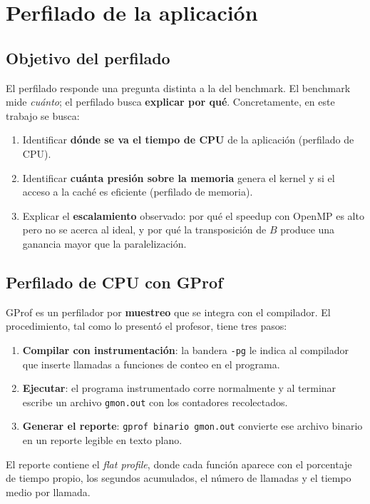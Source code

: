 \section{Perfilado de la aplicación}

\subsection{Objetivo del perfilado}

El perfilado responde una pregunta distinta a la del benchmark. El benchmark mide \emph{cuánto}; el perfilado busca \textbf{explicar por qué}. Concretamente, en este trabajo se busca:

\begin{enumerate}
    \item Identificar \textbf{dónde se va el tiempo de CPU} de la aplicación (perfilado de CPU).
    \item Identificar \textbf{cuánta presión sobre la memoria} genera el kernel y si el acceso a la caché es eficiente (perfilado de memoria).
    \item Explicar el \textbf{escalamiento} observado: por qué el speedup con OpenMP es alto pero no se acerca al ideal, y por qué la transposición de $B$ produce una ganancia mayor que la paralelización.
\end{enumerate}

\subsection{Perfilado de CPU con GProf}

GProf es un perfilador por \textbf{muestreo} que se integra con el compilador. El procedimiento, tal como lo presentó el profesor, tiene tres pasos:

\begin{enumerate}
    \item \textbf{Compilar con instrumentación}: la bandera \texttt{-pg} le indica al compilador que inserte llamadas a funciones de conteo en el programa.
    \item \textbf{Ejecutar}: el programa instrumentado corre normalmente y al terminar escribe un archivo \texttt{gmon.out} con los contadores recolectados.
    \item \textbf{Generar el reporte}: \texttt{gprof binario gmon.out} convierte ese archivo binario en un reporte legible en texto plano.
\end{enumerate}

El reporte contiene el \emph{flat profile}, donde cada función aparece con el porcentaje de tiempo propio, los segundos acumulados, el número de llamadas y el tiempo medio por llamada.

